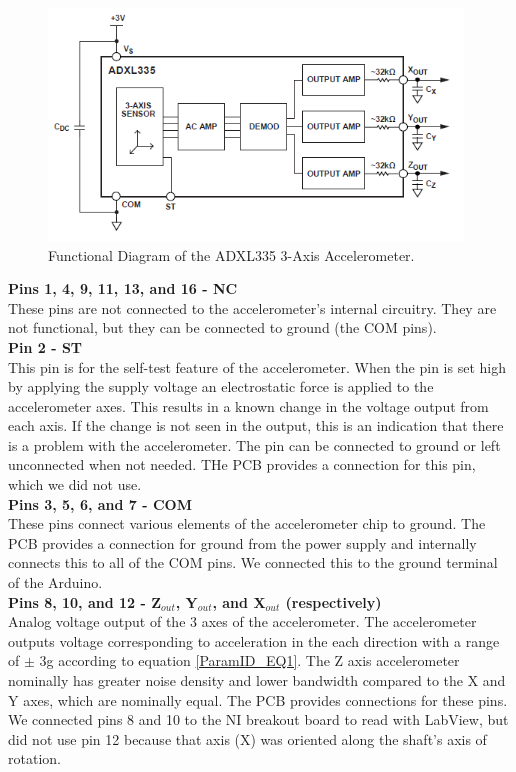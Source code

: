 \documentclass{article}
\theoremstyle{plain}
\theoremstyle{definition}
\theoremstyle{remark}
\begin{document}
\begin{figure}[hbt]
\begin{center}
\includegraphics[width = 11cm]{ADXL335Functional.png}
\caption{Functional Diagram of the ADXL335 3-Axis Accelerometer.}
\label{accelFunc}
\end{center}
\end{figure}

\textbf{Pins 1, 4, 9, 11, 13, and 16 - NC}\\
These pins are not connected to the accelerometer's internal circuitry. They are not functional, but they can be connected to ground (the COM pins).\\

\textbf{ Pin 2 - ST}\\
This pin is for the self-test feature of the accelerometer. When the pin is set high by applying the supply voltage an electrostatic force is applied to the accelerometer axes. This results in a known change in the voltage output from each axis. If the change is not seen in the output, this is an indication that there is a problem with the accelerometer. The pin can be connected to ground or left unconnected when not needed. THe PCB provides a connection for this pin, which we did not use.\\

\textbf{Pins 3, 5, 6, and 7 - COM}\\
These pins connect various elements of the accelerometer chip to ground. The PCB provides a connection for ground from the power supply and internally connects this to all of the COM pins. We connected this to the ground terminal of the Arduino.\\

\textbf{Pins 8, 10, and 12 - Z$_{out}$, Y$_{out}$, and X$_{out}$ (respectively)}\\ 
Analog voltage output of the 3 axes of the accelerometer. The accelerometer outputs voltage corresponding to acceleration in the each direction with a range of $\pm$ 3g according to equation \ref{ParamID_EQ1}. The Z axis accelerometer nominally has greater noise density and lower bandwidth compared to the X and Y axes, which are nominally equal. The PCB provides connections for these pins. We connected pins 8 and 10 to the NI breakout board to read with LabView, but did not use pin 12 because that axis (X) was oriented along the shaft's axis of rotation.\\
\end{document}

